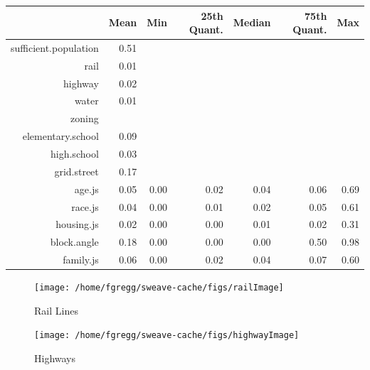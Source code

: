 \documentclass[12pt,letter]{article}\usepackage[]{graphicx}\usepackage[]{color}
\makeatletter
\newenvironment{kframe}{%
 \def\at@end@of@kframe{}%
 \ifinner\ifhmode%
  \def\at@end@of@kframe{\end{minipage}}%
  \begin{minipage}{\columnwidth}%
 \fi\fi%
 \def\FrameCommand##1{\hskip\@totalleftmargin \hskip-\fboxsep
 \colorbox{shadecolor}{##1}\hskip-\fboxsep
     \hskip-\linewidth \hskip-\@totalleftmargin \hskip\columnwidth}%
 \MakeFramed {\advance\hsize-\width
   \@totalleftmargin\z@ \linewidth\hsize
   \@setminipage}}%
 {\par\unskip\endMakeFramed%
 \at@end@of@kframe}
\newenvironment{knitrout}{}{} %
\makeatother
\begin{document}
\begin{kframe}


{\ttfamily\noindent\color{warningcolor}{\#\# Warning: argument is not numeric or logical: returning NA}}\end{kframe}%
\begin{table}[ht]
\centering
\begin{tabular}{rrrrrrr}
  \hline
 & Mean & Min & 25th Quant. & Median & 75th Quant. & Max \\ 
  \hline
sufficient.population & 0.51 &  &  &  &  &  \\ 
  rail & 0.01 &  &  &  &  &  \\ 
  highway & 0.02 &  &  &  &  &  \\ 
  water & 0.01 &  &  &  &  &  \\ 
  zoning &  &  &  &  &  &  \\ 
  elementary.school & 0.09 &  &  &  &  &  \\ 
  high.school & 0.03 &  &  &  &  &  \\ 
  grid.street & 0.17 &  &  &  &  &  \\ 
  age.js & 0.05 & 0.00 & 0.02 & 0.04 & 0.06 & 0.69 \\ 
  race.js & 0.04 & 0.00 & 0.01 & 0.02 & 0.05 & 0.61 \\ 
  housing.js & 0.02 & 0.00 & 0.00 & 0.01 & 0.02 & 0.31 \\ 
  block.angle & 0.18 & 0.00 & 0.00 & 0.00 & 0.50 & 0.98 \\ 
  family.js & 0.06 & 0.00 & 0.02 & 0.04 & 0.07 & 0.60 \\ 
   \hline
\end{tabular}
\end{table}



\begin{figure}
\begin{knitrout}
\color{fgcolor}

{\centering \texttt{[image: /home/fgregg/sweave-cache/figs/railImage]} 

}



\end{knitrout}

\caption{Rail Lines}
\end{figure}

\begin{figure}
\begin{knitrout}
\color{fgcolor}

{\centering \texttt{[image: /home/fgregg/sweave-cache/figs/highwayImage]} 

}



\end{knitrout}

\caption{Highways}
\end{figure}
\end{document}

